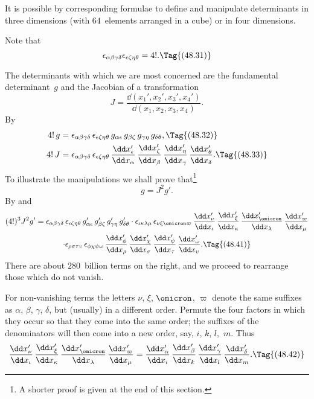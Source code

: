 \documentclass[12pt]{book}
\begin{document}
It is possible by corresponding formulae to define and manipulate determinants
in three dimensions (with $64$~elements arranged in a cube) or in
four dimensions.

Note that
\[
\epsilon_{\alpha\beta\gamma\delta} \epsilon_{\epsilon\zeta\eta\theta} = 4!.
\Tag{(48.31)}
\]

The determinants with which we are most concerned are the fundamental
determinant~$g$ and the Jacobian of a transformation
%
\[
J = \frac{\dd(x_{1}', x_{2}', x_{3}', x_{4}')}{\dd(x_{1}, x_{2}, x_{3}, x_{4})}.
\]
By~
\begin{align*}
  4!\, g &= \epsilon_{\alpha\beta\gamma\delta}\, \epsilon_{\epsilon\zeta\eta\theta}\,
  g_{\alpha\epsilon}\, g_{\beta\zeta}\, g_{\gamma\eta}\, g_{\delta\theta},
\Tag{(48.32)} \\
  4!\, J &= \epsilon_{\alpha\beta\gamma\delta}\, \epsilon_{\epsilon\zeta\eta\theta}\,
  \frac{\dd x_{\epsilon}'}{\dd x_{\alpha}}\,
  \frac{\dd x_{\zeta}'}{\dd x_{\beta}}\,
  \frac{\dd x_{\eta}'}{\dd x_{\gamma}}\,
  \frac{\dd x_{\theta}'}{\dd x_{\delta}}.
\Tag{(48.33)}
\end{align*}
To illustrate the manipulations we shall prove that\footnote
  {A shorter proof is given at the end of this section.}
\[
g = J^{2} g'.
\]
By  and~
\begin{multline*}
  (4!)^{3} J^{2} g'
  = \epsilon_{\alpha\beta\gamma\delta}\, \epsilon_{\epsilon\zeta\eta\theta}\,
  g_{\alpha\epsilon}'\, g_{\beta\zeta}'\, g_{\gamma\eta}'\, g_{\delta\theta}'
  \cdot \epsilon_{\iota\kappa\lambda\mu}\, \epsilon_{\nu\xi\omicron\varpi}\,
  \frac{\dd x_{\nu}'}{\dd x_{\iota}}\,
  \frac{\dd x_{\xi}'}{\dd x_{\kappa}}\,
  \frac{\dd x_{\omicron}'}{\dd x_{\lambda}}\,
  \frac{\dd x_{\varpi}'}{\dd x_{\mu}} \\
  \cdot \epsilon_{\rho\sigma\tau\upsilon}\, \epsilon_{\phi\chi\psi\omega}\,
  \frac{\dd x_{\phi}'}{\dd x_{\rho}}\,
  \frac{\dd x_{\chi}'}{\dd x_{\sigma}}\,
  \frac{\dd x_{\psi}'}{\dd x_{\tau}}\,
  \frac{\dd x_{\omega}'}{\dd x_{\upsilon}}.
  \Tag{(48.41)}
\end{multline*}
There are about $280$~billion terms on the right, and we proceed to rearrange
those which do not vanish.

For non\hyp{}vanishing terms the letters $\nu$, $\xi$, $\omicron$, $\varpi$ denote the same suffixes as
$\alpha$, $\beta$, $\gamma$, $\delta$, but (usually) in a different order. Permute the four factors in which
they occur so that they come into the same order; the suffixes of the denominators
will then come into a new order, say, $i$, $k$, $l$,~$m$. Thus
\[
  \frac{\dd x_{\nu}'}{\dd x_{\iota}}\,
  \frac{\dd x_{\xi}'}{\dd x_{\kappa}}\,
  \frac{\dd x_{\omicron}'}{\dd x_{\lambda}}\,
  \frac{\dd x_{\varpi}'}{\dd x_{\mu}}
  = \frac{\dd x_{\alpha}'}{\dd x_{i}}\,
  \frac{\dd x_{\beta}'}{\dd x_{k}}\,
  \frac{\dd x_{\gamma}'}{\dd x_{l}}\,
  \frac{\dd x_{\delta}'}{\dd x_{m}}.
\Tag{(48.42)}
\]
\end{document}
